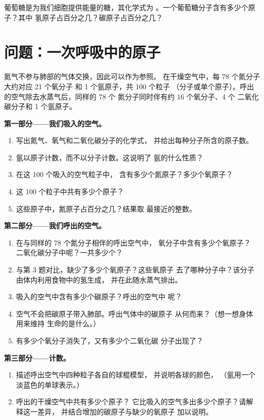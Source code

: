 \begin{exercise}[$\star\star\star$]\label{exo:g7:atoms-and-molecules:12}
葡萄糖是为我们细胞提供能量的糖，其化学式为
。一个葡萄糖分子含有多少个原子？其中
氢原子占百分之几？碳原子占百分之几？
\end{exercise}

\section{问题：一次呼吸中的原子}

\begin{problem}
\label{pb:g7:atoms-and-molecules:1}
氮气不参与肺部的气体交换，因此可以作为参照。
在干燥空气中，每 78 个氮分子大约对应 21 个氧分子
和 1 个氩原子，共 100 个粒子
（分子或单个原子）。呼出的空气除去水蒸气后，同样的 78 个
氮分子同时伴有约 16 个氧分子、4 个
二氧化碳分子和 1 个氩原子。

\medskip
\noindent\textbf{第一部分——我们吸入的空气。}
\begin{enumerate}
  \item 写出氮气、氧气和二氧化碳分子的化学式，
        并给出每种分子所含的原子数。
  \item 氩以原子计数，而不以分子计数。这说明了
        氩的什么性质？
  \item 在这 100 个吸入的空气粒子中，
        含有多少个氮原子？多少个氧原子？
  \item 这 100 个粒子中共有多少个原子？
  \item 这些原子中，氮原子占百分之几？结果取
        最接近的整数。
\end{enumerate}

\medskip
\noindent\textbf{第二部分——我们呼出的空气。}
\begin{enumerate}[resume]
  \item 在与同样的 78 个氮分子相伴的呼出空气中，
        氧分子中含有多少个氧原子？
        二氧化碳分子中呢？一共多少个？
  \item 与第 3 题对比，缺少了多少个氧原子？这些氧原子
        去了哪种分子中？该分子由体内利用食物中的氢生成，
        并在此随水蒸气排出。
  \item 吸入的空气中含有多少个碳原子？呼出的空气中
        呢？
  \item 空气不会把碳原子带入肺部。呼出气体中的碳原子
        从何而来？（想一想身体用来维持
        生命的是什么。）
  \item 有多少个氧分子消失了，又有多少个二氧化碳
        分子出现了？
\end{enumerate}

\medskip
\noindent\textbf{第三部分——计数。}
\begin{enumerate}[resume]
  \item 描述呼出空气中四种粒子各自的球棍模型，
        并说明各球的颜色，
        （氩用一个淡蓝色的单球表示。）
  \item 呼出的干燥空气中共有多少个原子？
        它比吸入的空气多出多少个原子？请解释这一差异，
        并结合增加的碳原子与缺少的氧原子
        加以说明。
\end{enumerate}
\end{problem}
